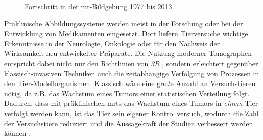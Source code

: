 \begin{figure}[H]
	\centering
	\hfill
	\caption{Fortschritt in der \gls{mr}-Bildgebung 1977 bis 2013}
	\label{fig:fortschritt}
\end{figure}

Präklinische Abbildungssysteme werden meist in der Forschung oder bei der Entwicklung von Medikamenten eingesetzt. Dort liefern Tierversuche wichtige Erkenntnisse in der Neurologie, Onkologie oder für den Nachweis der Wirksamkeit neu entwickelter Präparate. Die Nutzung moderner Tomographen entspricht dabei nicht nur den Richtlinien von \textit{3R} \cite{Russell1992}, sondern erleichtert gegenüber klassisch-invasiven Techniken auch die zeitabhängige Verfolgung von Prozessen in den Tier-Modellorganismen. Klassisch wäre eine große Anzahl an Versuchstieren nötig, da z.B. das Wachstum eines Tumors einer statistischen Verteilung folgt. Dadurch, dass mit präklinischen \gls{mrt}s das Wachstum eines Tumors in \emph{einem} Tier verfolgt werden kann, ist das Tier sein eigener Kontrollversuch, wodurch die Zahl der Versuchstiere reduziert und die Aussagekraft der Studien verbessert werden können \cite{Bradley2013}.

